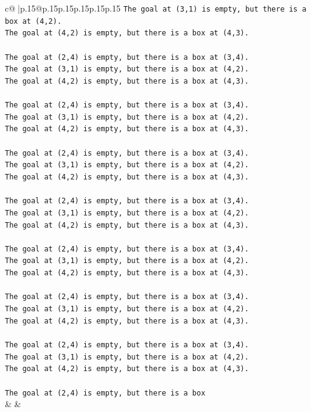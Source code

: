 \documentclass{article}
\begin{document}
{\begin{supertabular}{c@{$\;$}|p{.15\linewidth}@{}p{.15\linewidth}p{.15\linewidth}p{.15\linewidth}p{.15\linewidth}p{.15\linewidth}}
{{{\texttt{The goal at (3,1) is empty, but there is a box at (4,2).} \\
\texttt{The goal at (4,2) is empty, but there is a box at (4,3).} \\
\\ 
\texttt{The goal at (2,4) is empty, but there is a box at (3,4).} \\
\texttt{The goal at (3,1) is empty, but there is a box at (4,2).} \\
\texttt{The goal at (4,2) is empty, but there is a box at (4,3).} \\
\\ 
\texttt{The goal at (2,4) is empty, but there is a box at (3,4).} \\
\texttt{The goal at (3,1) is empty, but there is a box at (4,2).} \\
\texttt{The goal at (4,2) is empty, but there is a box at (4,3).} \\
\\ 
\texttt{The goal at (2,4) is empty, but there is a box at (3,4).} \\
\texttt{The goal at (3,1) is empty, but there is a box at (4,2).} \\
\texttt{The goal at (4,2) is empty, but there is a box at (4,3).} \\
\\ 
\texttt{The goal at (2,4) is empty, but there is a box at (3,4).} \\
\texttt{The goal at (3,1) is empty, but there is a box at (4,2).} \\
\texttt{The goal at (4,2) is empty, but there is a box at (4,3).} \\
\\ 
\texttt{The goal at (2,4) is empty, but there is a box at (3,4).} \\
\texttt{The goal at (3,1) is empty, but there is a box at (4,2).} \\
\texttt{The goal at (4,2) is empty, but there is a box at (4,3).} \\
\\ 
\texttt{The goal at (2,4) is empty, but there is a box at (3,4).} \\
\texttt{The goal at (3,1) is empty, but there is a box at (4,2).} \\
\texttt{The goal at (4,2) is empty, but there is a box at (4,3).} \\
\\ 
\texttt{The goal at (2,4) is empty, but there is a box at (3,4).} \\
\texttt{The goal at (3,1) is empty, but there is a box at (4,2).} \\
\texttt{The goal at (4,2) is empty, but there is a box at (4,3).} \\
\\ 
\texttt{The goal at (2,4) is empty, but there is a box} \\
            }
        }
    }
    & & \\ \\


\end{supertabular}}
\end{document}
